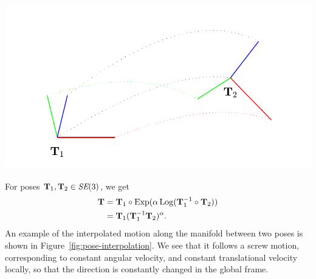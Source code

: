 \begin{example}[frametitle=Interpolation on the manifold]
{
  \centering
  \includegraphics[width=0.75\columnwidth]{figures/pose_interpolation.pdf}
  \captionsetup{type=figure}
  \label{fig:pose-interpolation}
  \par
}
For poses ${\boldsymbol{\mathbf{T}}}_1, {\boldsymbol{\mathbf{T}}}_2 \in \textit{SE}(3)$, we get
\begin{subequations}
\begin{align}
  {\boldsymbol{\mathbf{T}}} &= {\boldsymbol{\mathbf{T}}}_1 \circ \operatorname*{Exp}(\alpha \operatorname*{Log}({\boldsymbol{\mathbf{T}}}_1^{-1} \circ {\boldsymbol{\mathbf{T}}}_2))\\
  &= {\boldsymbol{\mathbf{T}}}_1({\boldsymbol{\mathbf{T}}}_1^{-1} {\boldsymbol{\mathbf{T}}}_2)^\alpha. \label{eq:pose-interp-example-exp}
\end{align}
\end{subequations}
An example of the interpolated motion along the manifold between two poses is shown in Figure~\ref{fig:pose-interpolation}.
We see that it follows a screw motion, corresponding to constant angular velocity, and constant translational velocity locally, so that the direction is constantly changed in the global frame.


\end{example}
